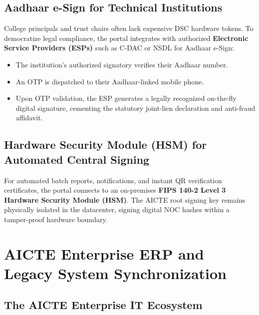 \documentclass[12pt, a4paper]{report}
\begin{document}
\section{Aadhaar e-Sign for Technical Institutions}

College principals and trust chairs often lack expensive DSC hardware tokens. To democratize legal compliance, the portal integrates with authorized \textbf{Electronic Service Providers (ESPs)} such as C-DAC or NSDL for Aadhaar e-Sign:
\begin{itemize}[leftmargin=2em]
  \item The institution's authorized signatory verifies their Aadhaar number.
  \item An OTP is dispatched to their Aadhaar-linked mobile phone.
  \item Upon OTP validation, the ESP generates a legally recognized on-the-fly digital signature, cementing the statutory joint-lien declaration and anti-fraud affidavit.
\end{itemize}

\section{Hardware Security Module (HSM) for Automated Central Signing}

For automated batch reports, notifications, and instant QR verification certificates, the portal connects to an on-premises \textbf{FIPS 140-2 Level 3 Hardware Security Module (HSM)}. The AICTE root signing key remains physically isolated in the datacenter, signing digital NOC hashes within a tamper-proof hardware boundary.


\chapter{AICTE Enterprise ERP and Legacy System Synchronization}

\section{The AICTE Enterprise IT Ecosystem}
\end{document}
